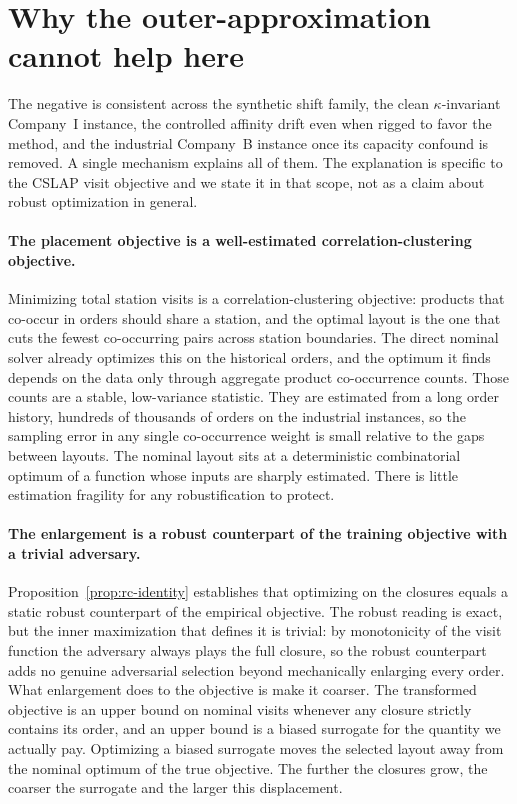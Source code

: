 \documentclass[preprint,review,11pt,authoryear]{elsarticle}
\begin{document}
\section{Why the outer-approximation cannot help here}\label{sec:rc-discussion}

The negative is consistent across the synthetic shift family, the clean $\kappa$-invariant Company~I instance, the controlled affinity drift even when rigged to favor the method, and the industrial Company~B instance once its capacity confound is removed. A single mechanism explains all of them. The explanation is specific to the CSLAP visit objective and we state it in that scope, not as a claim about robust optimization in general.

\paragraph{The placement objective is a well-estimated correlation-clustering objective.}
Minimizing total station visits is a correlation-clustering objective: products that co-occur in orders should share a station, and the optimal layout is the one that cuts the fewest co-occurring pairs across station boundaries. The direct nominal solver already optimizes this on the historical orders, and the optimum it finds depends on the data only through aggregate product co-occurrence counts. Those counts are a stable, low-variance statistic. They are estimated from a long order history, hundreds of thousands of orders on the industrial instances, so the sampling error in any single co-occurrence weight is small relative to the gaps between layouts. The nominal layout sits at a deterministic combinatorial optimum of a function whose inputs are sharply estimated. There is little estimation fragility for any robustification to protect.

\paragraph{The enlargement is a robust counterpart of the training objective with a trivial adversary.}
Proposition~\ref{prop:rc-identity} establishes that optimizing on the closures equals a static robust counterpart of the empirical objective. The robust reading is exact, but the inner maximization that defines it is trivial: by monotonicity of the visit function the adversary always plays the full closure, so the robust counterpart adds no genuine adversarial selection beyond mechanically enlarging every order. What enlargement does to the objective is make it coarser. The transformed objective is an upper bound on nominal visits whenever any closure strictly contains its order, and an upper bound is a biased surrogate for the quantity we actually pay. Optimizing a biased surrogate moves the selected layout away from the nominal optimum of the true objective. The further the closures grow, the coarser the surrogate and the larger this displacement.
\end{document}
